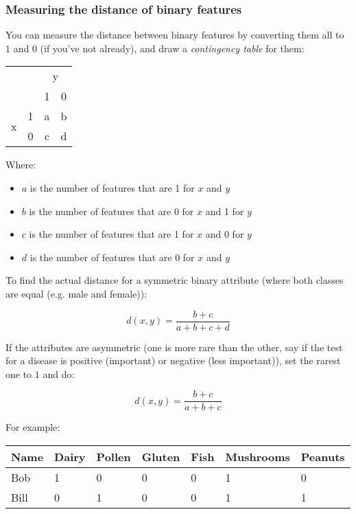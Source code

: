 \subsubsection{Measuring the distance of binary features}

You can measure the distance between binary features by converting them all to
$1$ and $0$ (if you've not already), and draw a \textit{contingency table} for
them:

\begin{table}[H]
  \centering
  \begin{tabular}{lc|cc}
    & \multicolumn{1}{l}{} & \multicolumn{2}{c}{y} \\
    & & 1 & 0 \\ \cline{2-4}
    \multirow{2}{*}{x} & 1 & a & b\\
    & 0 & c & d\\
  \end{tabular}
\end{table}

Where:
\begin{itemize}
  \item $a$ is the number of features that are 1 for $x$ and $y$
  \item $b$ is the number of features that are 0 for $x$ and 1 for $y$
  \item $c$ is the number of features that are 1 for $x$ and 0 for $y$
  \item $d$ is the number of features that are 0 for $x$ and $y$
\end{itemize}

To find the actual distance for a symmetric binary attribute (where both classes
are equal (e.g. male and female)):

\[
  d(x,y) = \frac{b + c}{a + b + c + d}
\]

If the attributes are asymmetric (one is more rare than the other, say if
the test for a disease is positive (important) or negative (less important)),
set the rarest one to $1$ and do:

\[
  d(x,y) = \frac{b + c}{a + b + c}
\]

For example:

\begin{center}
  \begin{tabular}{l llllll}
    Name & Dairy & Pollen & Gluten & Fish & Mushrooms & Peanuts\\ \hline
    Bob  & 1     & 0      & 0      & 0    & 1         & 0      \\
    Bill & 0     & 1      & 0      & 0    & 1         & 1      
  \end{tabular}
\end{center}

